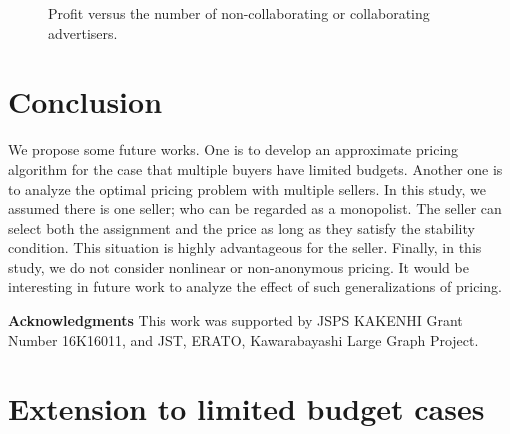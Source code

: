 \documentclass[letterpaper]{article}
\theoremstyle{definition}
\begin{document}
\begin{figure}[t]
\centering
\caption{Profit versus the number of non-collaborating or collaborating advertisers.}
\label{fig:advertisers}
\vspace{-1em}
\end{figure}


\section{Conclusion}
\label{sec:conclusion}

We propose some future works.
One is to develop an approximate pricing algorithm for the case that multiple buyers have limited budgets.
Another one is to analyze the optimal pricing problem with multiple sellers.
In this study, we assumed there is one seller; who can be regarded as a monopolist.
The seller can select both the assignment and the price as long as they satisfy the stability condition.
This situation is highly advantageous for the seller.
Finally, in this study, we do not consider nonlinear or non-anonymous pricing.
It would be interesting in future work to analyze the effect of such generalizations of pricing.

\medskip

\noindent \textbf{Acknowledgments} This work was supported by JSPS KAKENHI Grant Number 16K16011, and JST, ERATO, Kawarabayashi Large Graph Project.





\clearpage

\appendix

\section{Extension to limited budget cases}
\end{document}
